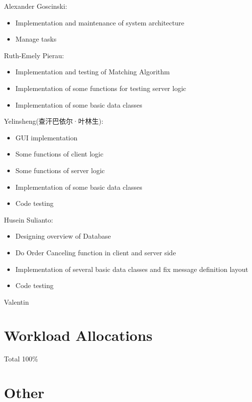 \documentclass[a4paper, 11pt]{article}
\begin{document}
Alexander Goscinski:
\begin{itemize}
  \item Implementation and maintenance of system architecture
  \item Manage tasks
\end{itemize}
Ruth-Emely Pierau:
\begin{itemize}
	\item Implementation and testing of Matching Algorithm
	\item Implementation of some functions for testing server logic
	\item Implementation of some basic data classes
\end{itemize}
Yelinsheng(查汗巴依尔·叶林生):
\begin{itemize}
  \item GUI implementation
  \item Some functions of client logic
  \item Some functions of server logic
  \item Implementation of some basic data classes
  \item Code testing
\end{itemize}
Husein Sulianto:
\begin{itemize}
  \item Designing overview of Database
  \item Do Order Canceling function in client and server side
  \item Implementation of several basic data classes and fix message definition layout
  \item Code testing
\end{itemize}
Valentin


\section*{Workload Allocations}
Total 100\% \\

\section*{Other}
\lipsum[7]
\end{document}
